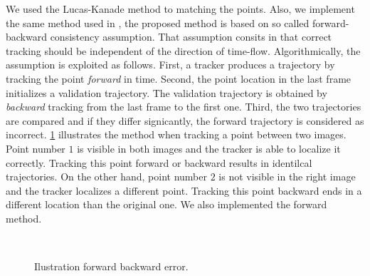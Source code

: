 \documentclass[12pt, a4paper, titlepage,twoside,openright]{article}
\begin{document}
We used the Lucas-Kanade method to matching the points. Also, we implement the same method used in \cite{medianFlow}, the proposed method is based on so called forward-backward consistency assumption. That assumption consits in that correct tracking should be independent of the direction of time-flow. Algorithmically, the assumption is exploited as follows. First, a tracker produces a trajectory by tracking the point \textit{forward} in time. Second, the point location in the last frame initializes a validation trajectory. The validation trajectory is obtained by \textit{backward} tracking from the last frame to the first one. Third, the two trajectories are compared and if they differ signicantly, the forward trajectory is considered as incorrect. \ref{motion23} illustrates the method when tracking a point between two images. Point number $1$  is visible in both images and the tracker is able to localize it correctly. Tracking this point forward or backward results in identilcal trajectories. On the other hand, point number $2$ is not visible in the right image and the tracker localizes a different point. Tracking this point backward ends in a different location than the original one. We also implemented the forward method.


%

\begin{figure}[H]
		
\centering

\\
\caption{Ilustration forward backward error.}
\label{motion23}
\end{figure}
\end{document}

